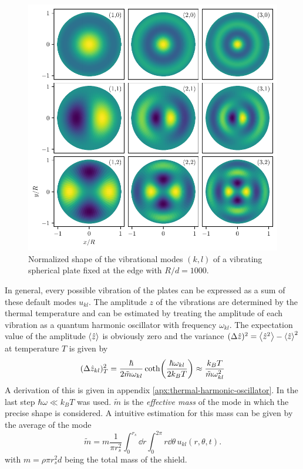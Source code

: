 \begin{figure}[!ht]
  \centering
  \includegraphics[width=\textwidth]{./../figures/vibrations/vibrational-modes.pdf}
  \caption{Normalized shape of the vibrational modes $(k,l)$ of a vibrating spherical plate fixed at the edge with $R/d = 1000$.}
  \label{fig:5:vibrational-modes}
\end{figure}
In general, every possible vibration of the plates can be expressed as a sum of these default modes $u_{kl}$. The amplitude $z$ of the vibrations are determined by the thermal temperature and can be estimated by treating the amplitude of each vibration as a quantum harmonic oscillator with frequency $\omega_{kl}$.
The expectation value of the amplitude $\left\langle\hat{z}\right\rangle$ is obviously zero and the variance $(\Delta \hat{z})^2 = \left\langle\hat{z}^2\right\rangle - \left\langle\hat{z}\right\rangle^2$ at temperature $T$ is given by
\begin{equation}\label{eq:5:amplitude-variance}
  (\Delta \hat{z}_{kl})^2_T = \frac{\hbar}{2\tilde{m}\omega_{kl}}\coth(\frac{\hbar \omega_{kl}}{2k_BT}) \approx \frac{k_B T}{\tilde{m}\omega_{kl}^2}
\end{equation}
A derivation of this is given in appendix \ref{apx:thermal-harmonic-oscillator}.
In the last step $\hbar\omega \ll k_B T$ was used. $\tilde{m}$ is the \textit{effective mass} of the mode in which the precise shape is considered. A intuitive estimation for this mass can be given by the average of the mode 
\begin{equation}\label{eq:5:effective-mass}
  \tilde{m} = m\frac{1}{\pi r_s^2}\int_0^{r_s} \dd r \int_0^{2\pi} r\dd\theta \, u_{kl}(r, \theta, t) .
\end{equation}
with $m=\rho \pi r_s^2 d$ being the total mass of the shield.


